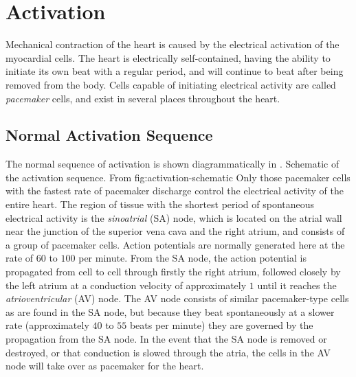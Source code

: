\section{Activation}

Mechanical contraction of the heart is caused by the electrical activation of
the myocardial cells.  The heart is electrically self-contained, having the
ability to initiate its own beat with a regular period, and will continue to
beat after being removed from the body.  Cells capable of initiating
electrical activity are called \emph{pacemaker} cells, and exist in several
places throughout the heart.

\subsection{Normal Activation Sequence}

The normal sequence of activation is shown diagrammatically in
.
 {Schematic
  of the activation sequence.  From \protect{}}{fig:activation-schematic} Only those pacemaker
cells with the fastest rate of pacemaker discharge control the electrical
activity of the entire heart.  The region of tissue with the shortest period
of spontaneous electrical activity is the \emph{sinoatrial} (SA) node, which
is located on the atrial wall near the junction of the superior vena cava and
the right atrium, and consists of a group of pacemaker cells.  Action
potentials are normally generated here at the rate of $60$ to $100$ per
minute.  From the SA node, the action potential is propagated from cell to
cell through firstly the right atrium, followed closely by the left atrium at
a conduction velocity of approximately $1$ \mps until it reaches the
\emph{atrioventricular} (AV) node.  The AV node consists of similar
pacemaker-type cells as are found in the SA node, but because they beat
spontaneously at a slower rate (approximately $40$ to $55$ beats per minute)
they are governed by the propagation from the SA node.  In the event that the
SA node is removed or destroyed, or that conduction is slowed through the
atria, the cells in the AV node will take over as pacemaker for the heart.

